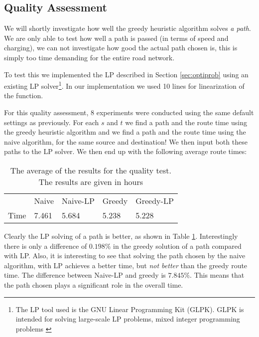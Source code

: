 \subsection{Quality Assessment}
We will shortly investigate how well the greedy heuristic algorithm solves \emph{a path}. We are only able to test how well a path is passed (in terms of speed and charging), we can not investigate how good the actual path chosen is, this is simply too time demanding for the entire road network.

To test this we implemented the LP described in Section \ref{sec:optiprob} using an existing LP solver\footnote{The LP tool used is the GNU Linear Programming Kit (GLPK). GLPK is intended for solving large-scale LP problems, mixed integer programming problems \cite{glpk}}. In our implementation we used 10 lines for linearization of the function. 

For this quality assessment, 8 experiments were conducted using the same default settings as previously. For each $s$ and $t$ we find a path and the route time using the greedy heuristic algorithm and we find a path and the route time using the naive algorithm, for the same source and destination! We then input both these paths to the LP solver. We then end up with the following average route times:
\begin{table}[!htb]
\begin{tabular}{ p{1cm} p{1.35cm} p{1.35cm} p{1.25cm} p{1.6cm}}
\hline
& Naive & Naive-LP  & Greedy  & Greedy-LP \\
Time & 7.461& 5.684 & 5.238 & 5.228\\
\hline
\end{tabular}
\caption{The average of the results for the quality test. The results are given in hours}
\label{tab:LP}
\end{table}

Clearly the LP solving of a path is better, as shown in Table \ref{tab:LP}. Interestingly there is only a difference of $0.198\%$ in the greedy solution of a path compared with LP. Also, it is interesting to see that solving the path chosen by the naive algorithm, with LP achieves a better time, but \emph{not better} than the greedy route time. The difference between Naive-LP and greedy is $7.845\%$. This means that the path chosen plays a significant role in the overall time.